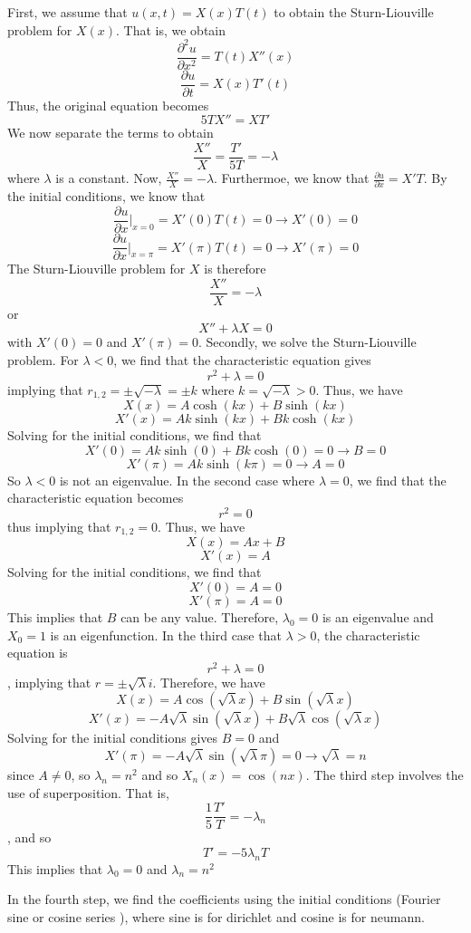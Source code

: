 \documentclass[11pt]{article}
\theoremstyle{plain} %
\theoremstyle{definition}
\theoremstyle{example}
\theoremstyle{remark}
\begin{document}
First, we assume that $u(x,t) = X(x)T(t)$ to obtain the Sturn-Liouville problem for $X(x)$. That is, we obtain $$\frac{\partial^2 u}{\partial x^2} = T(t)X''(x)$$
$$\frac{\partial u}{\partial t} = X(x)T'(t)$$
Thus, the original equation becomes $$5TX'' = XT'$$ We now separate the terms to obtain $$\frac{X''}{X} = \frac{T'}{5T} = -\lambda$$ 
where $\lambda$ is a constant. Now, $\frac{X''}{X} = -\lambda$. Furthermoe, we know that $\frac{\partial u}{\partial x} = X'T$. By the initial conditions, we know that 
$$\frac{\partial u}{\partial x}\Big|_{x=0} = X'(0)T(t) = 0 \rightarrow X'(0) = 0$$
$$\frac{\partial u}{\partial x}\Big|_{x=\pi} = X'(\pi)T(t) = 0 \rightarrow X'(\pi) = 0$$
The Sturn-Liouville problem for $X$ is therefore $$\frac{X''}{X} = -\lambda$$ or $$X'' + \lambda X = 0$$ with $X'(0) = 0$ and $X'(\pi) = 0$. 
Secondly, we solve the Sturn-Liouville problem. For $\lambda < 0$, we find that the characteristic equation gives $$r^2 + \lambda = 0$$ implying that $r_{1,2} = \pm\sqrt{-\lambda} = \pm k$ where $k =\sqrt{-\lambda} > 0$. Thus, we have 
$$X(x) = A\cosh(kx) + B\sinh(kx)$$
$$X'(x) = Ak\sinh(kx) + Bk\cosh(kx)$$
Solving for the initial conditions, we find that $$X'(0) = Ak\sinh(0) + Bk\cosh(0) = 0 \rightarrow B = 0$$
$$X'(\pi) = Ak\sinh(k\pi) = 0 \rightarrow A = 0$$
So $\lambda<0$ is not an eigenvalue. In the second case where $\lambda = 0$, we find that the characteristic equation becomes $$r^2 = 0$$ thus implying that $r_{1,2} = 0$. Thus, we have 
$$X(x) = Ax + B$$ 
$$X'(x) = A$$
Solving for the initial conditions, we find that  
$$X'(0) = A = 0$$
$$X'(\pi) = A = 0$$
This implies that $B$ can be any value. Therefore, $\lambda_0=0$ is an eigenvalue and $X_0 = 1$ is an eigenfunction. In the third case that $\lambda>0$, the characteristic equation is $$r^2 + \lambda = 0$$, implying that $r = \pm\sqrt{\lambda}i$. Therefore, we have $$X(x) = A\cos(\sqrt{\lambda}x) + B\sin(\sqrt{\lambda}x)$$
$$X'(x) = -A\sqrt{\lambda}\sin(\sqrt{\lambda}x) + B\sqrt{\lambda}\cos(\sqrt{\lambda}x)$$
Solving for the initial conditions gives $B = 0$ and $$X'(\pi) = -A\sqrt{\lambda}\sin(\sqrt{\lambda}\pi) = 0 \rightarrow \sqrt{\lambda} = n$$ since $A \neq 0$, so $\lambda_n = n^2$ and so $X_n(x) = \cos(nx)$.
The third step involves the use of superposition. That is, $$\frac{1}{5}\frac{T'}{T} = -\lambda_n$$, and so $$T' = -5\lambda_nT$$
This implies that $\lambda_0 = 0$ and $\lambda_n = n^2$

In the fourth step, we find the coefficients using the initial conditions (Fourier sine or cosine series ), where sine is for dirichlet and cosine is for neumann.
\end{document}
